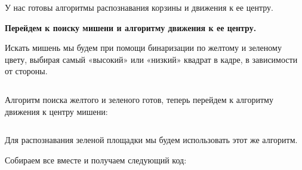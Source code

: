 \inputminted[fontsize=\footnotesize, linenos]{cpp}{final/command_tour/vrs/task_02/source_4.cpp}

У нас готовы алгоритмы распознавания корзины и движения к ее центру. 

\textbf{Перейдем к поиску мишени и алгоритму движения к ее центру.} 

Искать мишень мы будем при помощи бинаризации по желтому и зеленому цвету, выбирая самый «высокий» или «низкий» квадрат в кадре, в зависимости от стороны.

\inputminted[fontsize=\footnotesize, linenos]{cpp}{final/command_tour/vrs/task_02/source_5.cpp}

Алгоритм поиска желтого и зеленого готов, теперь перейдем к алгоритму движения к центру мишени:

\inputminted[fontsize=\footnotesize, linenos]{cpp}{final/command_tour/vrs/task_02/source_6.cpp}

Для распознавания зеленой площадки мы будем использовать этот же алгоритм. 

Собираем все вместе и получаем следующий код:

\inputminted[fontsize=\footnotesize, linenos]{cpp}{final/command_tour/vrs/task_02/source_7.cpp}